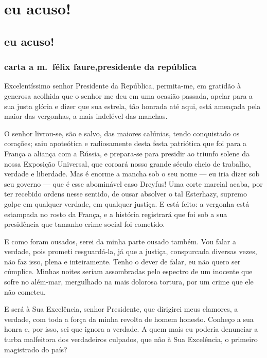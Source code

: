 
\part{eu acuso!}



\chapter[Eu acuso!,\\ por Émile Zola]{eu acuso!}

\section{carta a m.~félix faure,\break presidente da república}

Excelentíssimo senhor Presidente da República, 
permita-me, em gratidão à generosa acolhida que o senhor me deu em
uma ocasião passada, apelar para a sua justa glória e dizer que sua
estrela, tão honrada até aqui, está ameaçada pela maior das vergonhas,
a mais indelével das manchas.

O senhor livrou-se, são e salvo, das maiores calúnias, tendo
conquistado os corações; saiu apoteótica e radiosamente desta festa
patriótica que foi para a França a aliança com a Rússia, e prepara-se
para presidir ao triunfo solene da nossa Exposição Universal, que
coroará nosso grande século cheio de trabalho, verdade e liberdade. Mas
é enorme a mancha sob o seu nome --- eu iria dizer sob seu governo --- que
é esse abominável caso Dreyfus! Uma corte marcial acaba, por ter
recebido ordens nesse sentido, de ousar absolver o tal Esterhazy,
supremo golpe em qualquer verdade, em qualquer justiça. E está feito: a
vergonha está estampada no rosto da França, e a história registrará que
foi sob a sua presidência que tamanho crime social foi cometido.

 E como foram ousados, serei da minha parte ousado também. Vou falar a
verdade, pois prometi resguardá-la, já que a justiça, conspurcada
diversas vezes, não faz isso, plena e inteiramente. Tenho o dever de
falar, eu não quero ser cúmplice. Minhas noites seriam assombradas pelo
espectro de um inocente que sofre no além-mar, mergulhado na mais
dolorosa tortura, por um crime que ele não cometeu.

E será à Sua Excelência, senhor Presidente, que dirigirei meus
clamores, a verdade, com toda a força da minha revolta de homem
honesto. Conheço a sua honra e, por isso, sei que ignora a verdade. A 
quem mais eu poderia denunciar a turba malfeitora dos verdadeiros
culpados, que não à Sua Excelência, o primeiro magistrado do país?

